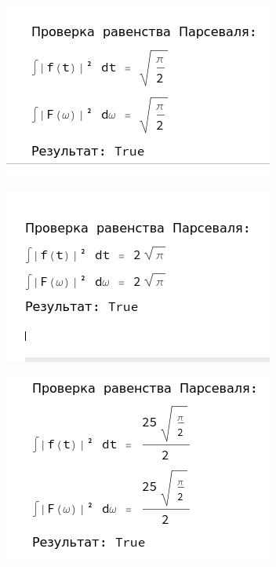 \documentclass[a4paper,12pt]{article}
\begin{document}
\begin{center}
\begin{minipage}{0.32\textwidth}
  \centering
  \includegraphics[width=\linewidth]{images/4P11.png}
\end{minipage}
\hfill
\begin{minipage}{0.32\textwidth}
  \centering
  \includegraphics[width=\linewidth]{images/4P22.png}
\end{minipage}
\hfill
\begin{minipage}{0.32\textwidth}
  \centering
  \includegraphics[width=\linewidth]{images/4P54.png}
\end{minipage}
\end{center}
\end{document}
